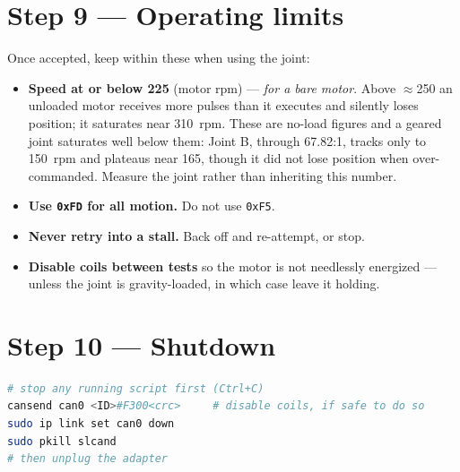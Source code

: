\documentclass[11pt,letterpaper]{article}
\begin{document}
\section*{Step 9 --- Operating limits}
Once accepted, keep within these when using the joint:

\begin{itemize}[leftmargin=*]
    \item \textbf{Speed at or below 225} (motor rpm) --- \emph{for a bare motor}.
          Above $\approx$250 an unloaded motor receives more pulses than it
          executes and silently loses position; it saturates near 310~rpm. These
          are no-load figures and a geared joint saturates well below them: Joint
          B, through 67.82:1, tracks only to 150~rpm and plateaus near 165, though
          it did not lose position when over-commanded. Measure the joint rather
          than inheriting this number.
    \item \textbf{Use \texttt{0xFD} for all motion.} Do not use \texttt{0xF5}.
    \item \textbf{Never retry into a stall.} Back off and re-attempt, or stop.
    \item \textbf{Disable coils between tests} so the motor is not needlessly
          energized --- unless the joint is gravity-loaded, in which case leave it
          holding.
\end{itemize}

\section*{Step 10 --- Shutdown}
\begin{lstlisting}[language=bash]
# stop any running script first (Ctrl+C)
cansend can0 <ID>#F300<crc>     # disable coils, if safe to do so
sudo ip link set can0 down
sudo pkill slcand
# then unplug the adapter
\end{lstlisting}
\end{document}
